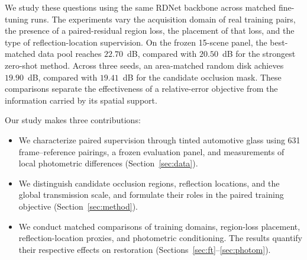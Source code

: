 We study these questions using the same RDNet backbone across
matched fine-tuning runs. The experiments vary the acquisition
domain of real training pairs, the presence of a paired-residual
region loss, the placement of that loss, and the type of
reflection-location supervision. On the frozen 15-scene panel,
the best-matched data pool reaches $22.70$~dB, compared with
$20.50$~dB for the strongest zero-shot method. Across three
seeds, an area-matched random disk achieves $19.90$~dB,
compared with $19.41$~dB for the candidate occlusion mask.
These comparisons separate the effectiveness of a relative-error
objective from the information carried by its spatial support.

Our study makes three contributions:
\begin{itemize}
  \item We characterize paired supervision through tinted automotive
  glass using 631 frame--reference pairings, a frozen evaluation
  panel, and measurements of local photometric differences
  (Section~\ref{sec:data}).
  \item We distinguish candidate occlusion regions, reflection
  locations, and the global transmission scale, and formulate
  their roles in the paired training objective
  (Section~\ref{sec:method}).
  \item We conduct matched comparisons of training domains,
  region-loss placement, reflection-location proxies, and
  photometric conditioning. The results quantify their
  respective effects on restoration
  (Sections~\ref{sec:ft}--\ref{sec:photom}).
\end{itemize}
